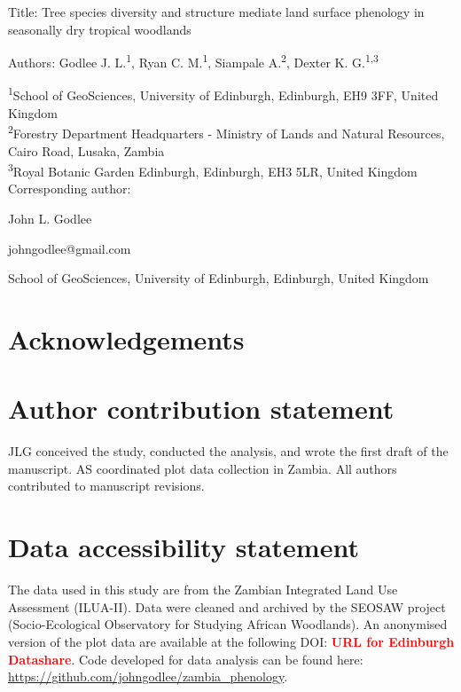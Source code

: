 \documentclass[11pt,a4paper]{article}
\newcommand{\todo}[1]{\textcolor{red}{\textbf{#1}}}   %
\begin{document}
{\Large{Title: Tree species diversity and structure mediate land surface phenology in seasonally dry tropical woodlands}}

Authors: Godlee J. L.\textsuperscript{1}, Ryan C. M.\textsuperscript{1}, Siampale A.\textsuperscript{2}, Dexter K. G.\textsuperscript{1,3}

\textsuperscript{1}School of GeoSciences, University of Edinburgh, Edinburgh, EH9 3FF, United Kingdom \\
\textsuperscript{2}Forestry Department Headquarters - Ministry of Lands and Natural Resources, Cairo Road, Lusaka, Zambia \\
\textsuperscript{3}Royal Botanic Garden Edinburgh, Edinburgh, EH3 5LR, United Kingdom \\

\vspace{1em}
Corresponding author:

John L. Godlee

johngodlee@gmail.com

School of GeoSciences, University of Edinburgh, Edinburgh, United Kingdom

\section*{Acknowledgements}

\section*{Author contribution statement}

JLG conceived the study, conducted the analysis, and wrote the first draft of the manuscript. AS coordinated plot data collection in Zambia. All authors contributed to manuscript revisions. 

\section*{Data accessibility statement}

The data used in this study are from the Zambian Integrated Land Use Assessment (ILUA-II). Data were cleaned and archived by the SEOSAW project (Socio-Ecological Observatory for Studying African Woodlands). An anonymised version of the plot data are available at the following DOI: \todo{URL for Edinburgh Datashare}. Code developed for data analysis can be found here: \url{https://github.com/johngodlee/zambia_phenology}.

\newpage{}
\linenumbers
\end{document}
